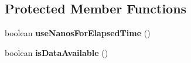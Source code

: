 \subsection*{Protected Member Functions}
\begin{DoxyCompactItemize}
\item 
\mbox{\label{classcom_1_1mysql_1_1cj_1_1protocol_1_1a_1_1_native_protocol_a900d2347cc59f2b6eb37112a903e774d}} 
boolean {\bfseries use\+Nanos\+For\+Elapsed\+Time} ()
\item 
\mbox{\label{classcom_1_1mysql_1_1cj_1_1protocol_1_1a_1_1_native_protocol_a9da03d669e459b563d2c8edfe5501ce7}} 
boolean {\bfseries is\+Data\+Available} ()
\end{DoxyCompactItemize}
